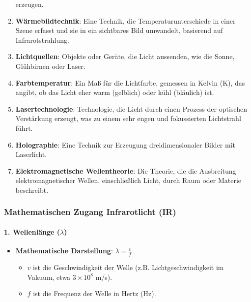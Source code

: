 \documentclass{vorlage-design-main}
\begin{document}
\begin{enumerate}
  erzeugen.
\item
  \textbf{Wärmebildtechnik}: Eine Technik, die Temperaturunterschiede in
  einer Szene erfasst und sie in ein sichtbares Bild umwandelt,
  basierend auf Infrarotstrahlung.
\item
  \textbf{Lichtquellen}: Objekte oder Geräte, die Licht aussenden, wie
  die Sonne, Glühbirnen oder Laser.
\item
  \textbf{Farbtemperatur}: Ein Maß für die Lichtfarbe, gemessen in
  Kelvin (K), das angibt, ob das Licht eher warm (gelblich) oder kühl
  (bläulich) ist.
\item
  \textbf{Lasertechnologie}: Technologie, die Licht durch einen Prozess
  der optischen Verstärkung erzeugt, was zu einem sehr engen und
  fokussierten Lichtstrahl führt.
\item
  \textbf{Holographie}: Eine Technik zur Erzeugung dreidimensionaler
  Bilder mit Laserlicht.
\item
  \textbf{Elektromagnetische Wellentheorie}: Die Theorie, die die
  Ausbreitung elektromagnetischer Wellen, einschließlich Licht, durch
  Raum oder Materie beschreibt.
\end{enumerate}

\hypertarget{mathematischen-zugang-infrarotlicht-ir}{%
\subsubsection{Mathematischen Zugang Infrarotlicht
(IR)}\label{mathematischen-zugang-infrarotlicht-ir}}

\hypertarget{wellenluxe4nge-lambda}{%
\paragraph{\texorpdfstring{1. Wellenlänge
($\lambda$)}{1. Wellenlänge (\textbackslash lambda)}}\label{wellenlaenge-lambda}}

\begin{itemize}

\item
  \textbf{Mathematische Darstellung}: $\lambda = \frac{v}{f}$

  \begin{itemize}
  
  \item
    $v$ ist die Geschwindigkeit der Welle (z.B. Lichtgeschwindigkeit
    im Vakuum, etwa $3 \times 10^8$ m/s).
  \item
    $f$ ist die Frequenz der Welle in Hertz (Hz).
  \end{itemize}
\end{itemize}
\end{document}
